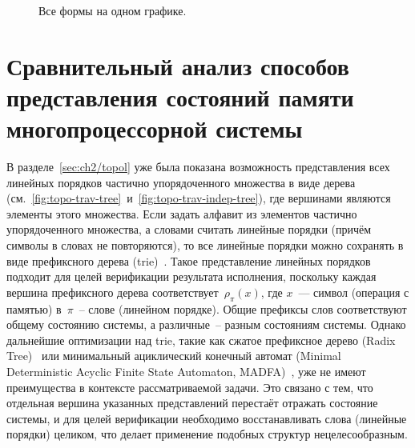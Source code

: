 \begin{figure}[htbp]
  \centering
  
  \caption{Все формы на одном графике.}
  \label{fig:all_shapes_cmp}
\end{figure}

\section{Сравнительный анализ способов представления состояний памяти
многопроцессорной системы}
\label{sec:ch5/sg-linext-comp}

В разделе~\ref{sec:ch2/topol} уже была показана возможность
представления всех линейных порядков частично упорядоченного
множества в виде дерева
(см.~\ref{fig:topo-trav-tree}~и~\ref{fig:topo-trav-indep-tree}), где
вершинами являются элементы этого множества.
Если задать алфавит из элементов частично упорядоченного множества, а
словами считать линейные порядки (причём символы в словах не
повторяются), то все линейные порядки можно сохранять в виде
префиксного дерева (trie)~\cite{connelly1995generalization}.
Такое представление линейных порядков подходит для целей верификации
результата исполнения, поскольку каждая вершина префиксного дерева
соответствует~$\rho_{\pi}(x)$, где $x$~--- символ (операция с
памятью) в~$\pi$~-- слове (линейном порядке). Общие префиксы слов
соответствуют общему состоянию системы, а различные~-- разным
состояниям системы.
Однако дальнейшие оптимизации над trie, такие как сжатое префиксное дерево
(Radix Tree)~\cite{leis2013adaptive} или минимальный ациклический
конечный автомат (Minimal Deterministic Acyclic Finite State
Automaton, MADFA)~\cite{watson2010constructing}, уже не имеют
преимущества в контексте рассматриваемой задачи. Это связано с тем,
что отдельная вершина указанных представлений перестаёт отражать
состояние системы, и для целей верификации необходимо восстанавливать
слова (линейные порядки) целиком, что делает применение подобных
структур нецелесообразным.

